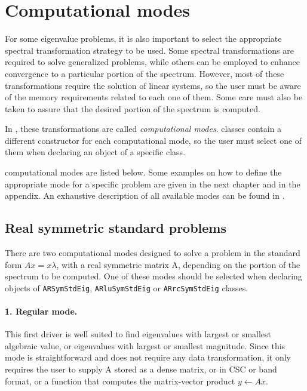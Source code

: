 \section{Computational modes}
For some eigenvalue problems, it is also important to select the appropriate spectral transformation strategy to be used. Some spectral transformations are required to solve generalized problems, while others can be employed to enhance convergence to a particular portion of the spectrum. However, most of these transformations require the solution of linear systems, so the user must be aware of the memory requirements related to each one of them. Some care must also be taken to assure that the desired portion of the spectrum is computed.

In \ARPP{}, these transformations are called \textit{computational modes}. \ARPP{} classes contain a different constructor for each computational mode, so the user must select one of them when declaring an object of a specific class.

\ARPP{} computational modes are listed below. Some examples on how to define the appropriate mode for a specific problem are given in the next chapter and in the appendix. An exhaustive description of all available \ARP{} modes can be found in \cite{Lehoucq:1997:ARPACK}.

\subsection{Real symmetric standard problems}
There are two computational modes designed to solve a problem in the standard form $Ax=x\lambda$, with a real symmetric matrix A, depending on the portion of the spectrum to be computed. One of these modes should be selected when declaring objects of \texttt{ARSymStdEig}, \texttt{ARluSymStdEig} or \texttt{ARrcSymStdEig} classes.

\paragraph{1. Regular mode.}
This first driver is well suited to find eigenvalues with largest or smallest algebraic value, or eigenvalues with largest or smallest magnitude. Since this mode is straightforward and does not require any data transformation, it only requires the user to supply A stored as a dense matrix, or in CSC or band format, or a function that computes the matrix-vector product $y \leftarrow Ax$. 

